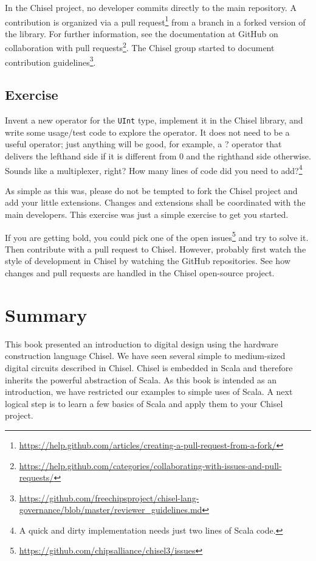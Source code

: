 \documentclass[%
    10pt,
    headinclude, footexclude,
    openright, %
    notitlepage,
    cleardoubleempty,
    headsepline,
    pointlessnumbers,
    bibtotoc, idxtotoc,
    ]{scrbook}
\newcommand{\code}[1]{{\small{\texttt{#1}}}}
\newcommand{\myref}[2]{\href{#1}{#2}}
\renewcommand{\myref}[2]{{#2}{\footnote{\url{#1}}}}
\begin{document}
In the Chisel project, no developer commits directly to the main repository.
A contribution is organized via a
\myref{https://help.github.com/articles/creating-a-pull-request-from-a-fork/}{pull request}
from a branch in a forked version of the library.
For further information, see the documentation at GitHub on
\myref{https://help.github.com/categories/collaborating-with-issues-and-pull-requests/}{collaboration with
pull requests}.
The Chisel group started to document
\myref{https://github.com/freechipsproject/chisel-lang-governance/blob/master/reviewer_guidelines.md}{contribution
guidelines}.

\section{Exercise}

Invent a new operator for the \code{UInt} type, implement it in the Chisel library,
and write some usage/test code to explore the operator. It does not need to be
a useful operator; just anything will be good, for example, a ? operator that delivers the lefthand side
if it is different from 0 and the righthand side otherwise. Sounds like a multiplexer, right?
How many lines of code did you need to add?\footnote{A quick and dirty implementation
needs just two lines of Scala code.}

As simple as this was, please do not be tempted to fork the Chisel project and
add your little extensions. Changes and extensions shall be coordinated with the
main developers.
This exercise was just a simple exercise to get you started.

If you are getting bold, you could pick one of the
\myref{https://github.com/chipsalliance/chisel3/issues}{open issues} and try to solve it.
Then contribute with a pull request to Chisel.
However, probably first watch the style of development in Chisel by watching the GitHub
repositories.
See how changes and pull requests are handled in the Chisel open-source project.


\chapter{Summary}
\label{sec:conclusion}

This book presented an introduction to digital design using the
hardware construction language Chisel.
We have seen several simple to medium-sized digital circuits
described in Chisel.
Chisel is embedded in Scala and therefore inherits the powerful
abstraction of Scala.
As this book is intended as an introduction, we have restricted
our examples to simple uses of Scala.
A next logical step is to learn a few basics of Scala and apply them
to your Chisel project.
\end{document}
